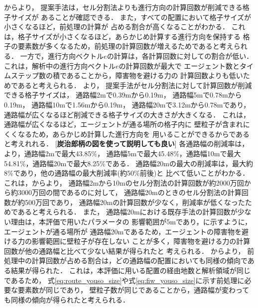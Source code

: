 からより，
提案手法は，セル分割法よりも進行方向の計算回数が削減できる格子サイズが
あることが確認できる．
また，すべての配置において格子サイズが小さくなるほど，前処理の計算が
占める割合が高くなることがわかる．
これは，格子サイズが小さくなるほど，あらかじめ計算する進行方向を保持する
格子の要素数が多くなるため，前処理の計算回数が増えるためであると考えられる．
一方で，進行方向ベクトル$e$の計算は，各計算回数に対しての割合が低い．
これは，解析中の進行方向ベクトル$e$の計算回数が最大で
エージェント数とタイムステップ数の積であることから，障害物を避ける力の
計算回数よりも低いためであると考えられる．
%
より，
提案手法がセル分割法に対して計算回数が削減できる格子サイズは，
通路幅2mで0.39mから0.19m，
通路幅5mで0.78mから0.19m，
通路幅10mで1.56mから0.19m，
通路幅20mで3.12mから0.78mであり，
通路幅が広くなるほど削減できる格子サイズの大きさが大きくなる．
これは，通路幅が広くなるほど，エージェントが通る場所の格子内に
壁粒子が含まれにくくなるため，あらかじめ計算した進行方向を
用いることができるからであると考えれれる．
[\textbf{炭治郎柄の図を使って説明しても良い}]
%
各通路幅の削減率は，より，通路幅2mで最大43.85\%，
通路幅5mで最大45.48\%，通路幅10mで最大54.81\%，通路幅20mで最大8.25\%である．
通路幅20mの最大の削減率は，最大約8\%であり，他の通路幅の最大削減率(約50\%前後)と
比べて低いことがわかる．
これは，からより，
通路幅2mから10mのセル分割法の計算回数が約2000万回から約3000万回の間であるのに対して，
通路幅20mのときのセル分割法の計算回数が約500万回であり，
通路幅20mの計算回数が少なく，削減率が低くなったためであると考えられる．
また，
通路幅20mにおける既存手法の計算回数が少ない理由は，本評価で用いたパラメータの
影響範囲が5mであり，に示すように，エージェントが通る場所が
通路幅20mであるため，エージェントの障害物を避ける力の影響範囲に壁粒子が存在しない
ことが多く，障害物を避ける力の計算回数が他の通路幅と比べて少ない結果が得られたと
考えられる．
%
からより，
前処理中の計算回数が占める割合は，どの通路幅の配置においても同様の傾向である結果が得られた．
これは，本評価に用いる配置の経由地数と解析領域が同じであるため，
式\eqref{eq:route_youso_size}や式\eqref{eq:fiw_youso_size}に示す前処理に必要な要素数が同じであり，
壁粒子数が同じであることから，通路幅が変わっても同様の傾向が得られたと考えられる．


